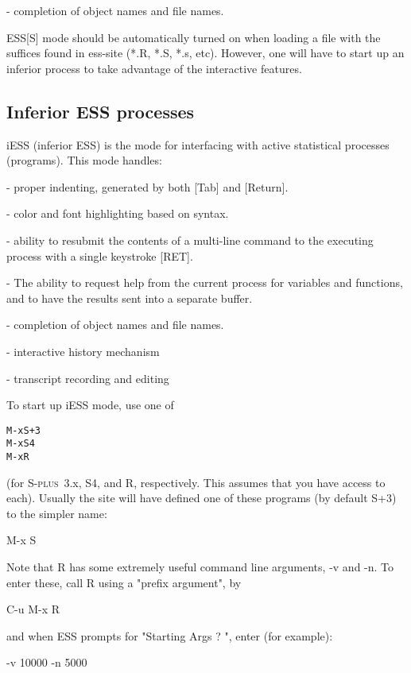 \documentclass{article}
\newcommand*{\Splus}{\textsc{S-plus}}
\newenvironment{Salltt}{\small\begin{alltt}}{\end{alltt}}
\begin{document}
- completion of object names and file names.

ESS[S] mode should be automatically turned on when loading a file with
the suffices found in ess-site (*.R, *.S, *.s, etc).  However, one
will have to start up an inferior process to take advantage of the
interactive features.


\subsection{Inferior ESS processes}
\label{sec:S:inf}

iESS (inferior ESS) is the mode for interfacing with active
statistical processes (programs).  This mode handles:

- proper indenting, generated by both [Tab] and [Return].

- color and font highlighting based on syntax.

- ability to resubmit the contents of a multi-line command
  to the executing process with a single keystroke [RET].

- The ability to request help from the current process for variables
  and functions, and to have the results sent into a separate buffer.

- completion of object names and file names.

- interactive history mechanism

- transcript recording and editing

To start up iESS mode, use one of
\begin{Salltt}
   M-x S+3 
   M-x S4
   M-x R
\end{Salltt}
(for \Splus~3.x, S4, and R, respectively.  This assumes that you have
access to each).  Usually the site will have defined one of these programs
(by default S+3) to the simpler name:

   M-x S



Note that R has some extremely useful command line arguments, 
-v and -n.   To enter these, call R using a "prefix argument", by

   C-u M-x R

and when ESS prompts for "Starting Args ? ", enter (for example):

   -v 10000 -n 5000
\end{document}
